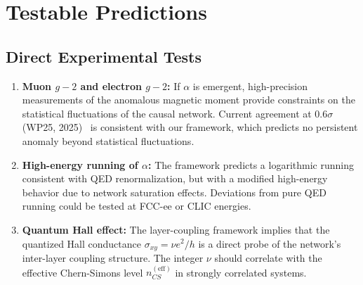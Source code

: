 \documentclass[11pt,a4paper]{article}
\theoremstyle{definition}
\theoremstyle{remark}
\begin{document}
\section{Testable Predictions}\label{sec:predictions}

\subsection{Direct Experimental Tests}\label{subsec:experiments}

\begin{enumerate}[noitemsep]
\item \textbf{Muon $g-2$ and electron $g-2$:} If $\alpha$ is emergent,
high-precision measurements of the anomalous magnetic moment provide
constraints on the statistical fluctuations of the causal network. Current
agreement at $0.6\sigma$ (WP25, 2025)~\cite{MuonG2Theory2025,MuonG2Exp2025}
is consistent with our framework, which predicts no persistent anomaly beyond
statistical fluctuations.

\item \textbf{High-energy running of $\alpha$:} The framework predicts a
logarithmic running consistent with QED renormalization, but with a modified
high-energy behavior due to network saturation effects. Deviations from pure
QED running could be tested at FCC-ee or CLIC energies.

\item \textbf{Quantum Hall effect:} The layer-coupling framework implies
that the quantized Hall conductance $\sigma_{xy} = \nu e^{2}/h$ is a direct
probe of the network's inter-layer coupling structure. The integer $\nu$
should correlate with the effective Chern-Simons level $n_{CS}^{(\text{eff})}$
in strongly correlated systems.


\end{enumerate}
\end{document}
